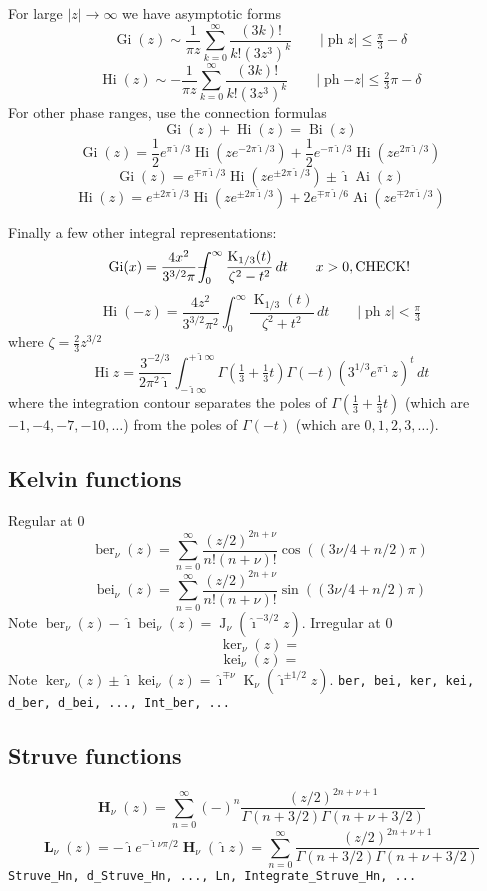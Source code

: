 \documentclass[10pt,dvipdfmx,letterpaper,twoside]{article}
\let\O=\operatorname
\newcommand{\Ob}[1]{\operatorname{\mathbf{#1}}}
\newcommand{\ii}{{\hat{\imath}}}
\def\Xint#1{\mathchoice
{\XXint\displaystyle\textstyle{#1}} 
{\XXint\textstyle\scriptstyle{#1}} 
{\XXint\scriptstyle\scriptscriptstyle{#1}} 
{\XXint\scriptscriptstyle\scriptscriptstyle{#1}} 
\!\int}
\def\XXint#1#2#3{{\setbox0=\hbox{$#1{#2#3}{\int}$ }
\vcenter{\hbox{$#2#3$ }}\kern-.5\wd0}}
\def\dashint{\Xint-}
\let\Gam=\Gamma
\begin{document}
For large $|z|\to\infty$ we have asymptotic forms
\[ \O{Gi}(z) \sim \frac{1}{\pi z}\sum_{k=0}^\infty \frac{(3k)!}{k!(3z^3)^k} \qquad |\O{ph}z|\leq\tfrac\pi3 - \delta \]
\[ \O{Hi}(z) \sim -\frac{1}{\pi z}\sum_{k=0}^\infty \frac{(3k)!}{k!(3z^3)^k} \qquad |\O{ph} {-z}|\leq\tfrac23\pi - \delta \]
For other phase ranges, use the connection formulas
\[ \O{Gi}(z) + \O{Hi}(z) = \O{Bi}(z) \]
\[ \O{Gi}(z) = \frac12 e^{\pi\ii/3}\O{Hi}(z e^{-2\pi\ii/3}) + \frac12 e^{-\pi\ii/3}\O{Hi}(z e^{2\pi\ii/3}) \]
\[ \O{Gi}(z) = e^{\mp\pi\ii/3}\O{Hi}(z e^{\pm2\pi\ii/3}) \pm \ii \O{Ai}(z) \]
\[ \O{Hi}(z) = e^{\pm2\pi\ii/3}\O{Hi}(z e^{\pm2\pi\ii/3}) + 2 e^{\mp\pi\ii/6}\O{Ai}(z e^{\mp2\pi\ii/3}) \]

Finally a few other integral representations:
\[ \O{Gi}(x) = \frac{4x^2}{3^{3/2}\pi} \dashint_0^\infty\frac{\O{K}_{1/3}(t)}{\zeta^2 - t^2}\,dt \qquad x>0, \text{CHECK!} \]
\[ \O{Hi}(-z) = \frac{4z^2}{3^{3/2}\pi^2} \int_0^\infty\frac{\O{K}_{1/3}(t)}{\zeta^2 + t^2}\,dt \qquad |\O{ph} z|<\tfrac\pi3 \]
where $\zeta=\tfrac23z^{3/2}$
\[ \O{Hi}{z} = \frac{3^{-2/3}}{2\pi^2\ii} \int_{-\ii\infty}^{+\ii\infty} \Gam(\tfrac13+\tfrac13t)\Gam(-t)(3^{1/3}e^{\pi\ii}z)^t\,dt \]
where the integration contour separates the poles of $\Gam(\tfrac13+\tfrac13t)$ (which are $-1, -4, -7, -10, \dots$)
from the poles of $\Gam(-t)$ (which are $0, 1, 2, 3, \dots$).

\subsection{Kelvin functions}
Regular at 0
\[ \O{ber}_\nu(z) = \sum_{n=0}^\infty \frac{(z/2)^{2n+\nu}}{n!(n+\nu)!}\cos( (3\nu/4 + n/2) \pi)\]
\[ \O{bei}_\nu(z) = \sum_{n=0}^\infty \frac{(z/2)^{2n+\nu}}{n!(n+\nu)!}\sin( (3\nu/4 + n/2) \pi)\]
Note $\O{ber}_\nu(z) - \ii\O{bei}_\nu(z) = \O{J}_\nu(\ii^{-3/2}z)$.
Irregular at 0
\[ \O{ker}_\nu(z) = \]
\[ \O{kei}_\nu(z) = \]
Note $\O{ker}_\nu(z) \pm \ii\O{kei}_\nu(z) = \ii^{\mp\nu}\O{K}_\nu(\ii^{\pm1/2}z)$.
{\tt ber, bei, ker, kei, d\_ber, d\_bei, ..., Int\_ber, ...}

\subsection{Struve functions}
\[ \Ob{H}_\nu(z) = \sum_{n=0}^\infty (-)^n \frac{(z/2)^{2n+\nu+1}}{\Gamma(n+3/2)\Gamma(n+\nu+3/2)} \]
\[ \Ob{L}_\nu(z) = -\ii e^{-\ii\nu\pi/2}\O{\mathbf{H}}_\nu(\ii z) = \sum_{n=0}^\infty \frac{(z/2)^{2n+\nu+1}}{\Gamma(n+3/2)\Gamma(n+\nu+3/2)} \]
{\tt Struve\_Hn, d\_Struve\_Hn, ..., Ln, Integrate\_Struve\_Hn, ...}
\end{document}

